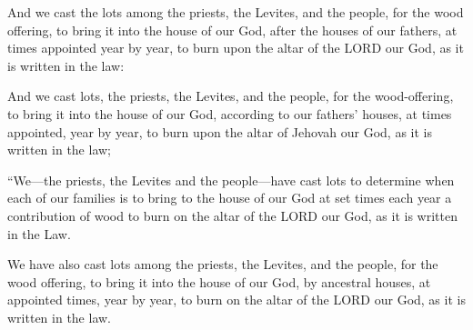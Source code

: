 			And we cast the lots among the priests, the Levites, and the people, for the wood offering, to bring it into the house of our God, after the houses of our fathers, at times appointed year by year, to burn upon the altar of the LORD our God, as it is written in the law:

			\begin{versebox}
					\item[BHS] 
					\item[LXX] 
					\item[ASV] And we cast lots, the priests, the Levites, and the people, for the wood-offering, to bring it into the house of our God, according to our fathers' houses, at times appointed, year by year, to burn upon the altar of Jehovah our God, as it is written in the law;
					\item[NIV] “We—the priests, the Levites and the people—have cast lots to determine when each of our families is to bring to the house of our God at set times each year a contribution of wood to burn on the altar of the LORD our God, as it is written in the Law.
					\item[NRSV] We have also cast lots among the priests, the Levites, and the people, for the wood offering, to bring it into the house of our God, by ancestral houses, at appointed times, year by year, to burn on the altar of the LORD our God, as it is written in the law.
			\end{versebox}

